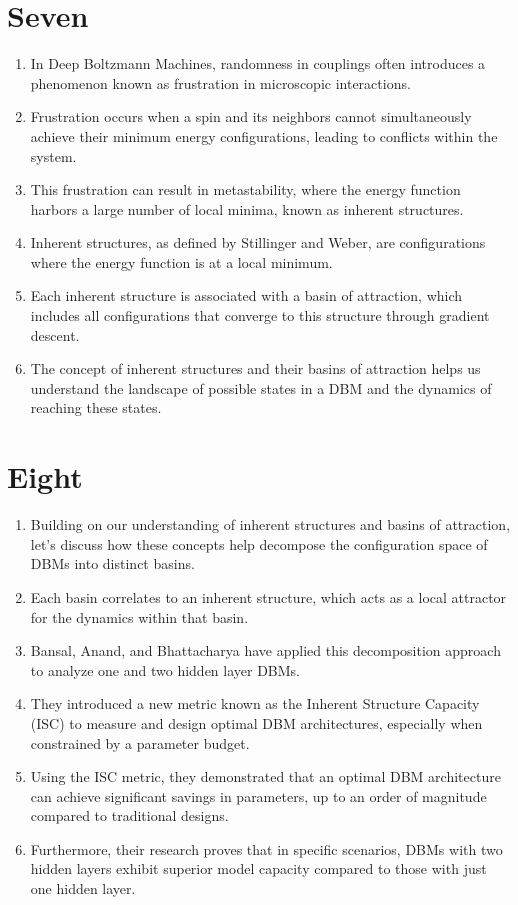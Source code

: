 \documentclass{article}
\begin{document}
\section*{Seven}
\begin{enumerate}
    \item In Deep Boltzmann Machines, randomness in couplings often introduces a phenomenon known as frustration in microscopic interactions.
    \item Frustration occurs when a spin and its neighbors cannot simultaneously achieve their minimum energy configurations, leading to conflicts within the system.
    \item This frustration can result in metastability, where the energy function harbors a large number of local minima, known as inherent structures.
    \item Inherent structures, as defined by Stillinger and Weber, are configurations where the energy function is at a local minimum.
    \item Each inherent structure is associated with a basin of attraction, which includes all configurations that converge to this structure through gradient descent.
    \item The concept of inherent structures and their basins of attraction helps us understand the landscape of possible states in a DBM and the dynamics of reaching these states.
\end{enumerate}

\section*{Eight}
\begin{enumerate}
    \item Building on our understanding of inherent structures and basins of attraction, let's discuss how these concepts help decompose the configuration space of DBMs into distinct basins.
    \item Each basin correlates to an inherent structure, which acts as a local attractor for the dynamics within that basin.
    \item Bansal, Anand, and Bhattacharya have applied this decomposition approach to analyze one and two hidden layer DBMs.
    \item They introduced a new metric known as the Inherent Structure Capacity (ISC) to measure and design optimal DBM architectures, especially when constrained by a parameter budget.
    \item Using the ISC metric, they demonstrated that an optimal DBM architecture can achieve significant savings in parameters, up to an order of magnitude compared to traditional designs.
    \item Furthermore, their research proves that in specific scenarios, DBMs with two hidden layers exhibit superior model capacity compared to those with just one hidden layer.
\end{enumerate}
\end{document}

